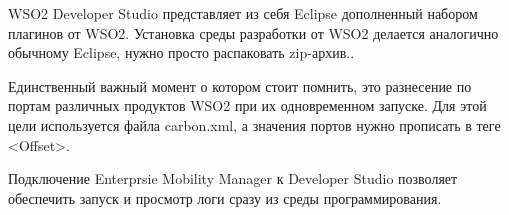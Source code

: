 \documentclass[a4paper, 12pt]{article}		%
\begin{document}
WSO2 Developer Studio представляет из себя Eclipse дополненный набором плагинов от WSO2. Установка среды разработки от WSO2 делается аналогично обычному Eclipse, нужно просто распаковать zip-архив..

Единственный важный момент о котором стоит помнить, это разнесение по портам различных продуктов WSO2 при их одновременном запуске. Для этой цели используется файла carbon.xml, а значения портов нужно прописать в теге <Offset>.

Подключение Enterprsie Mobility Manager к Developer Studio позволяет обеспечить запуск и просмотр логи сразу из среды программирования.



\end{document}
